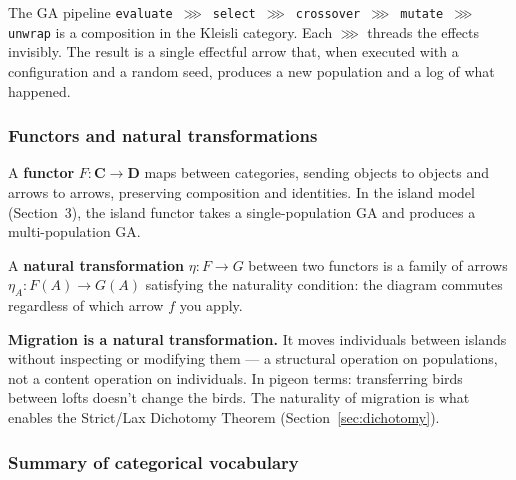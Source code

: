 \documentclass[10pt]{article}
\newcommand{\catC}{\mathbf{C}}
\newcommand{\catD}{\mathbf{D}}
\begin{document}
The GA pipeline \texttt{evaluate $\ggg$ select $\ggg$ crossover $\ggg$ mutate $\ggg$ unwrap} is a composition in the Kleisli category. Each $\ggg$ threads the effects invisibly. The result is a single effectful arrow that, when executed with a configuration and a random seed, produces a new population and a log of what happened.

\subsubsection*{Functors and natural transformations}

A \textbf{functor} $F : \catC \to \catD$ maps between categories, sending objects to objects and arrows to arrows, preserving composition and identities. In the island model (Section~3), the island functor takes a single-population GA and produces a multi-population GA.

A \textbf{natural transformation} $\eta : F \to G$ between two functors is a family of arrows $\eta_A : F(A) \to G(A)$ satisfying the naturality condition: the diagram commutes regardless of which arrow $f$ you apply.

\textbf{Migration is a natural transformation.} It moves individuals between islands without inspecting or modifying them --- a structural operation on populations, not a content operation on individuals. In pigeon terms: transferring birds between lofts doesn't change the birds. The naturality of migration is what enables the Strict/Lax Dichotomy Theorem (Section~\ref{sec:dichotomy}).

\subsubsection*{Summary of categorical vocabulary}
\end{document}
